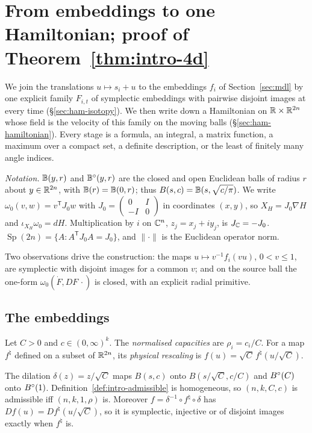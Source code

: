 \section{From embeddings to one Hamiltonian; proof of Theorem~\texorpdfstring{\ref{thm:intro-4d}}{A}}\label{sec:ham}

We join the translations $u\mapsto s_i+u$ to the embeddings $f_i$ of Section~\ref{sec:mdl} by one explicit family $F_{i,t}$ of symplectic embeddings with pairwise disjoint images at every time (\S\ref{sec:ham-isotopy}). We then write down a Hamiltonian on $\mathbb{R}\times\mathbb{R}^{2n}$ whose field is the velocity of this family on the moving balls (\S\ref{sec:ham-hamiltonian}). Every stage is a formula, an integral, a matrix function, a maximum over a compact set, a definite description, or the least of finitely many angle indices.

\emph{Notation.} $\mathbb{B}(y,r)$ and $\mathbb{B}^\circ(y,r)$ are the closed and open Euclidean balls of radius $r$ about $y\in\mathbb{R}^{2n}$, with $\mathbb{B}(r)=\mathbb{B}(0,r)$; thus $B(s,c)=\mathbb{B}(s,\sqrt{c/\pi})$. We write $\omega_0(v,w)=v^{\mathsf T}J_0w$ with $J_0=\left(\begin{smallmatrix}0&I\\-I&0\end{smallmatrix}\right)$ in coordinates $(x,y)$, so $X_H=J_0\nabla H$ and $\iota_{X_H}\omega_0=dH$. Multiplication by $i$ on $\mathbb{C}^n$, $z_j=x_j+iy_j$, is $J_{\mathbb{C}}=-J_0$. $\operatorname{Sp}(2n)=\{A:A^{\mathsf T}J_0A=J_0\}$, and $\|\cdot\|$ is the Euclidean operator norm.

Two observations drive the construction: the maps $u\mapsto v^{-1}f_i(vu)$, $0<v\le1$, are symplectic with disjoint images for a common $v$; and on the source ball the one-form $\omega_0(\dot F,DF\,\cdot)$ is closed, with an explicit radial primitive.

\subsection{The embeddings}\label{sec:ham-embeddings}

\begin{definition}[Normalisation]\label{def:ham-normalise}
Let $C>0$ and $c\in(0,\infty)^k$. The \emph{normalised capacities} are $\rho_i=c_i/C$. For a map $f^\natural$
defined on a subset of $\mathbb{R}^{2n}$, its \emph{physical rescaling} is $f(u)=\sqrt C\,f^\natural(u/\sqrt C)$.
\end{definition}

The dilation $\delta(z)=z/\sqrt C$ maps $B(s,c)$ onto $B(s/\sqrt C,c/C)$ and $B^{\circ}(C)$ onto $B^{\circ}(1)$. Definition~\ref{def:intro-admissible} is homogeneous, so $(n,k,C,c)$ is admissible iff $(n,k,1,\rho)$ is. Moreover $f=\delta^{-1}\circ f^\natural\circ\delta$ has $Df(u)=Df^\natural(u/\sqrt C)$, so it is symplectic, injective or of disjoint images exactly when $f^\natural$ is.

